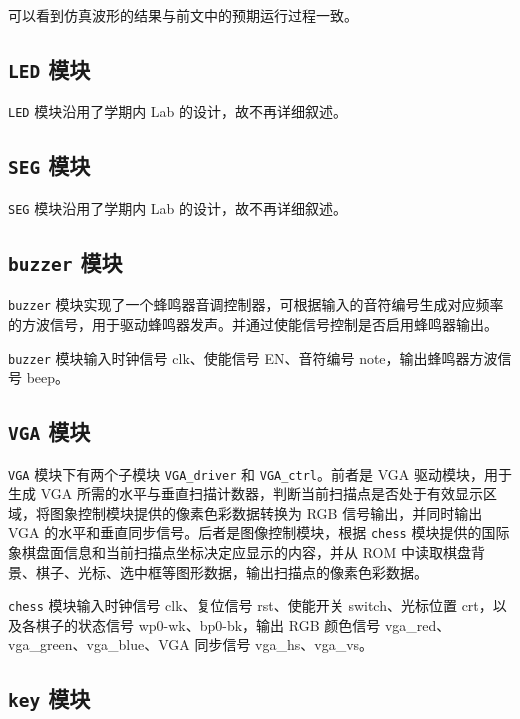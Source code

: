 \documentclass[a4paper, 12pt]{article}
\begin{document}
            可以看到仿真波形的结果与前文中的预期运行过程一致。
        
        \subsection{\texttt{LED} 模块}

            \texttt{LED} 模块沿用了学期内 Lab 的设计，故不再详细叙述。

        \subsection{\texttt{SEG} 模块}

            \texttt{SEG} 模块沿用了学期内 Lab 的设计，故不再详细叙述。

        \subsection{\texttt{buzzer} 模块}

            \texttt{buzzer} 模块实现了一个蜂鸣器音调控制器，可根据输入的音符编号生成对应频率的方波信号，用于驱动蜂鸣器发声。并通过使能信号控制是否启用蜂鸣器输出。

            \texttt{buzzer} 模块输入时钟信号 clk、使能信号 EN、音符编号 note，输出蜂鸣器方波信号 beep。

        \subsection{\texttt{VGA} 模块}

            \texttt{VGA} 模块下有两个子模块 \texttt{VGA\_driver} 和 \texttt{VGA\_ctrl}。前者是 VGA 驱动模块，用于生成 VGA 所需的水平与垂直扫描计数器，判断当前扫描点是否处于有效显示区域，将图象控制模块提供的像素色彩数据转换为 RGB 信号输出，并同时输出 VGA 的水平和垂直同步信号。后者是图像控制模块，根据 \texttt{chess} 模块提供的国际象棋盘面信息和当前扫描点坐标决定应显示的内容，并从 ROM 中读取棋盘背景、棋子、光标、选中框等图形数据，输出扫描点的像素色彩数据。

            \texttt{chess} 模块输入时钟信号 clk、复位信号 rst、使能开关 switch、光标位置 crt，以及各棋子的状态信号 wp0-wk、bp0-bk，输出 RGB 颜色信号 vga\_red、vga\_green、vga\_blue、VGA 同步信号 vga\_hs、vga\_vs。

        \subsection{\texttt{key} 模块}
\end{document}
